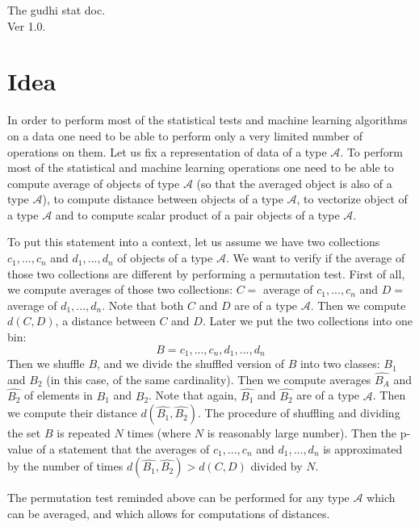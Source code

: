 \documentclass[11pt]{article}
\begin{document}
\begin{center}
\Huge{The gudhi stat doc.\\
Ver 1.0.}
\end{center}


\section{Idea}

In order to perform most of the statistical tests and machine learning algorithms on a data one need to be able to perform only a very limited number of operations on them. Let us fix a representation of data of a type $\mathcal{A}$. To perform most of the statistical and machine learning operations one need to be able to compute average of objects of type $\mathcal{A}$ (so that the averaged object is also of a type $\mathcal{A}$), to compute distance between objects of a type $\mathcal{A}$, to vectorize object of a type $\mathcal{A}$ and to compute scalar product of a pair objects of a type $\mathcal{A}$.

To put this statement into a context, let us assume we have two collections $c_1,...,c_n$ and $d_1,...,d_n$ of objects of a type $\mathcal{A}$. We want to verify if the average of those two collections are different by performing a permutation test.
First of all, we compute averages of those two collections: $C =$ average of $c_1,...,c_n$ and $D =$ average of $d_1,...,d_n$. Note that both $C$ and $D$ are of a type $\mathcal{A}$. Then we compute $d(C,D)$, a distance between $C$ and $D$.
Later we put the two collections into one bin:\\
\[B = { c_1,...,c_n,d_1,...,d_n }\]
Then we shuffle $B$, and we divide the shuffled version of $B$ into two classes: $B_1$ and $B_2$ (in this case, of the same cardinality). Then we compute averages $\hat{B_A}$ and $\hat{B_2}$ of elements in $B_1$ and $B_2$. Note that again, $\hat{B_1}$ and $\hat{B_2}$ are of a type $\mathcal{A}$. Then we compute their distance $d(\hat{B_1},\hat{B_2})$. The procedure of shuffling and dividing the set $B$ is repeated $N$ times (where $N$ is reasonably large number).
Then the p-value of a statement that the averages of  $c_1,...,c_n$ and $d_1,...,d_n$ is approximated by the number of times $d(\hat{B_1},\hat{B_2}) > d(C,D)$ divided by $N$.

The permutation test reminded above can be performed for any type $\mathcal{A}$ which can be averaged, and which allows for computations of distances. 
\end{document}
